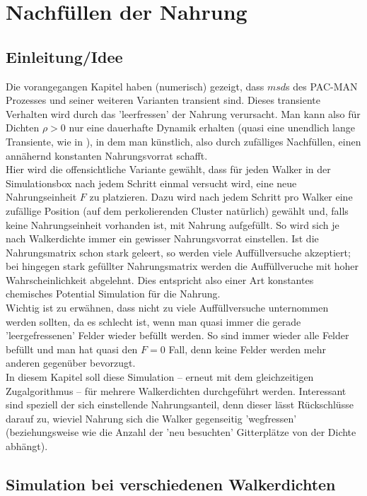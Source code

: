 \documentclass[a4paper, 12pt]{report}
\begin{document}
\chapter{Nachfüllen der Nahrung}

\section{Einleitung/Idee}

Die vorangegangen Kapitel haben (numerisch) gezeigt, dass $msd$s des PAC-MAN Prozesses und seiner weiteren Varianten transient sind. Dieses transiente Verhalten wird durch das 'leerfressen' der Nahrung verursacht. Man kann also für Dichten $\rho > 0$ nur eine dauerhafte Dynamik erhalten (quasi eine unendlich lange Transiente, wie in \cite{doi:10.1063/1.4999485}), in dem man künstlich, also durch zufälliges Nachfüllen, einen annähernd konstanten Nahrungsvorrat schafft.
\\
Hier wird die offensichtliche Variante gewählt, dass für jeden Walker in der Simulationsbox nach jedem Schritt einmal versucht wird, eine neue Nahrungseinheit $F$ zu platzieren. Dazu wird nach jedem Schritt pro Walker eine zufällige Position (auf dem perkolierenden Cluster natürlich) gewählt und, falls keine Nahrungseinheit vorhanden ist, mit Nahrung aufgefüllt. So wird sich je nach Walkerdichte immer ein gewisser Nahrungsvorrat einstellen. Ist die Nahrungsmatrix schon stark geleert, so werden viele Auffüllversuche akzeptiert; bei hingegen stark gefüllter Nahrungsmatrix werden die Auffüllveruche mit hoher Wahrscheinlichkeit abgelehnt. Dies entspricht also einer Art konstantes chemisches Potential Simulation für die Nahrung.
\\
Wichtig ist zu erwähnen, dass nicht zu viele Auffüllversuche unternommen werden sollten, da es schlecht ist, wenn man quasi immer die gerade 'leergefressenen' Felder wieder befüllt werden. So sind immer wieder alle Felder befüllt und man hat quasi den $F=0$ Fall, denn keine Felder werden mehr anderen gegenüber bevorzugt.
\\
In diesem Kapitel soll diese Simulation -- erneut mit dem gleichzeitigen Zug\-algorithmus -- für mehrere Walkerdichten durchgeführt werden. Interessant sind speziell der sich einstellende Nahrungsanteil, denn dieser lässt Rückschlüsse darauf zu, wieviel Nahrung sich die Walker gegenseitig 'wegfressen' (beziehungsweise wie die Anzahl der 'neu besuchten' Gitterplätze von der Dichte abhängt).

\section{Simulation bei verschiedenen Walkerdichten}
\end{document}

